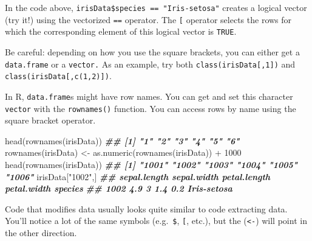 \documentclass[
  12pt,
  krantz2]{krantz}
\makeatletter
\newenvironment{Shaded}{\begin{snugshade}}{\end{snugshade}}
\newcommand{\DecValTok}[1]{\textcolor[rgb]{0.06,0.06,0.06}{#1}}
\newcommand{\DocumentationTok}[1]{\textcolor[rgb]{0.37,0.37,0.37}{\textbf{\textit{#1}}}}
\newcommand{\FunctionTok}[1]{\textcolor[rgb]{0,0,0}{#1}}
\newcommand{\NormalTok}[1]{#1}
\newcommand{\OtherTok}[1]{\textcolor[rgb]{0.37,0.37,0.37}{#1}}
\newcommand{\SpecialCharTok}[1]{\textcolor[rgb]{0,0,0}{#1}}
\newcommand{\StringTok}[1]{\textcolor[rgb]{0.5,0.5,0.5}{#1}}
\newenvironment{kframe}{%
\medskip{}
\setlength{\fboxsep}{.8em}
 \def\at@end@of@kframe{}%
 \ifinner\ifhmode%
  \def\at@end@of@kframe{\end{minipage}}%
  \begin{minipage}{\columnwidth}%
 \fi\fi%
 \def\FrameCommand##1{\hskip\@totalleftmargin \hskip-\fboxsep
 \colorbox{shadecolor}{##1}\hskip-\fboxsep
     \hskip-\linewidth \hskip-\@totalleftmargin \hskip\columnwidth}%
 \MakeFramed {\advance\hsize-\width
   \@totalleftmargin\z@ \linewidth\hsize
   \@setminipage}}%
 {\par\unskip\endMakeFramed%
 \at@end@of@kframe}
\renewenvironment{Shaded}{\begin{kframe}}{\end{kframe}}
\newenvironment{rmd-details}{\begin{lrbox}{\rmdbox}
  \minipage[c]{\dimexpr \textwidth-2\fboxrule-\wd\bulb-\columnsep}
    \vspace*{\columnsep}}%
{\vspace*{\columnsep}\endminipage\end{lrbox}%
  {\par\color{green}\fboxsep=0pt
    \fbox{\usebox\bulb\usebox\rmdbox\hspace{\columnsep}}\par}}
\makeatother
\begin{document}
In the code above, \texttt{irisData\$species\ ==\ "Iris-setosa"} creates a logical vector (try it!) using the vectorized \texttt{==} operator. The \texttt{{[}} operator selects the rows for which the corresponding element of this logical vector is \texttt{TRUE}.

\begin{rmd-details}
Be careful: depending on how you use the square brackets, you can either get a \texttt{data.frame} or a \texttt{vector.} As an example, try both \texttt{class(irisData{[},1{]})} and \texttt{class(irisData{[},c(1,2){]})}.

\end{rmd-details}

In R, \texttt{data.frame}s might have row names. You can get and set this character \texttt{vector} with the \texttt{rownames()} function. You can access rows by name using the square bracket operator.

\begin{Shaded}
\begin{Highlighting}[]
\FunctionTok{head}\NormalTok{(}\FunctionTok{rownames}\NormalTok{(irisData))}
\DocumentationTok{\#\# [1] "1" "2" "3" "4" "5" "6"}
\FunctionTok{rownames}\NormalTok{(irisData) }\OtherTok{\textless{}{-}} \FunctionTok{as.numeric}\NormalTok{(}\FunctionTok{rownames}\NormalTok{(irisData)) }\SpecialCharTok{+} \DecValTok{1000}
\FunctionTok{head}\NormalTok{(}\FunctionTok{rownames}\NormalTok{(irisData))}
\DocumentationTok{\#\# [1] "1001" "1002" "1003" "1004" "1005" "1006"}
\NormalTok{irisData[}\StringTok{"1002"}\NormalTok{,]}
\DocumentationTok{\#\#      sepal.length sepal.width petal.length petal.width     species}
\DocumentationTok{\#\# 1002          4.9           3          1.4         0.2 Iris{-}setosa}
\end{Highlighting}
\end{Shaded}

Code that modifies data usually looks quite similar to code extracting data. You'll notice a lot of the same symbols (e.g.~\texttt{\$}, \texttt{{[}}, etc.), but the (\texttt{\textless{}-}) will point in the other direction.
\end{document}
